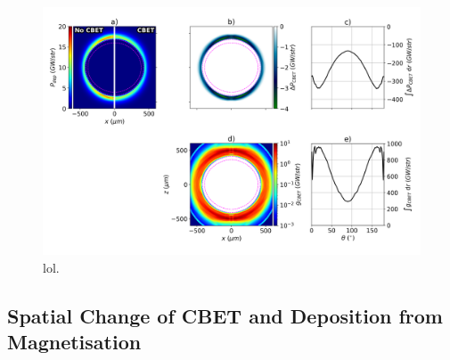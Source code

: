 \begin{figure}[t!]
    \includegraphics[width=\linewidth]{Results2/Images/magcbet_analysis.png}
    \centering
    \caption{lol.}%
    \label{fig:Res2_magcbet_analysis}
\end{figure}


\subsection{Spatial Change of CBET and Deposition from Magnetisation}%
\label{sec:Res2_mag_on_cbet_change}

